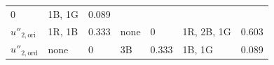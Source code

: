 \begin{longtable}[]{@{}lllllll@{}}
\begin{minipage}[t]{0.08\columnwidth}
0\strut
\end{minipage} & \begin{minipage}[t]{0.14\columnwidth}\raggedright
1B, 1G\strut
\end{minipage} & \begin{minipage}[t]{0.08\columnwidth}\raggedright
0.089\strut
\end{minipage}\tabularnewline
\begin{minipage}[t]{0.12\columnwidth}\raggedright
\(u''_{2,\text{ori}}\)\strut
\end{minipage} & \begin{minipage}[t]{0.14\columnwidth}\raggedright
1R, 1B\strut
\end{minipage} & \begin{minipage}[t]{0.08\columnwidth}\raggedright
0.333\strut
\end{minipage} & \begin{minipage}[t]{0.14\columnwidth}\raggedright
none\strut
\end{minipage} & \begin{minipage}[t]{0.08\columnwidth}\raggedright
0\strut
\end{minipage} & \begin{minipage}[t]{0.14\columnwidth}\raggedright
1R, 2B, 1G\strut
\end{minipage} & \begin{minipage}[t]{0.08\columnwidth}\raggedright
0.603\strut
\end{minipage}\tabularnewline
\begin{minipage}[t]{0.12\columnwidth}\raggedright
\(u''_{2,\text{ord}}\)\strut
\end{minipage} & \begin{minipage}[t]{0.14\columnwidth}\raggedright
none\strut
\end{minipage} & \begin{minipage}[t]{0.08\columnwidth}\raggedright
0\strut
\end{minipage} & \begin{minipage}[t]{0.14\columnwidth}\raggedright
3B\strut
\end{minipage} & \begin{minipage}[t]{0.08\columnwidth}\raggedright
0.333\strut
\end{minipage} & \begin{minipage}[t]{0.14\columnwidth}\raggedright
1B, 1G\strut
\end{minipage} & \begin{minipage}[t]{0.08\columnwidth}\raggedright
0.089\strut

\end{minipage}
\end{longtable}
